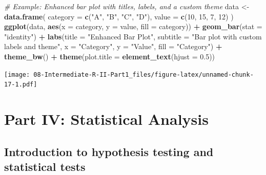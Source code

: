 \documentclass[
]{book}
\newenvironment{Shaded}{\begin{snugshade}}{\end{snugshade}}
\newcommand{\AttributeTok}[1]{\textcolor[rgb]{0.13,0.29,0.53}{#1}}
\newcommand{\CommentTok}[1]{\textcolor[rgb]{0.56,0.35,0.01}{\textit{#1}}}
\newcommand{\DecValTok}[1]{\textcolor[rgb]{0.00,0.00,0.81}{#1}}
\newcommand{\FloatTok}[1]{\textcolor[rgb]{0.00,0.00,0.81}{#1}}
\newcommand{\FunctionTok}[1]{\textcolor[rgb]{0.13,0.29,0.53}{\textbf{#1}}}
\newcommand{\NormalTok}[1]{#1}
\newcommand{\OtherTok}[1]{\textcolor[rgb]{0.56,0.35,0.01}{#1}}
\newcommand{\SpecialCharTok}[1]{\textcolor[rgb]{0.81,0.36,0.00}{\textbf{#1}}}
\newcommand{\StringTok}[1]{\textcolor[rgb]{0.31,0.60,0.02}{#1}}
\begin{document}
\begin{Shaded}
\begin{Highlighting}[]
\CommentTok{\# Example: Enhanced bar plot with titles, labels, and a custom theme}
\NormalTok{data }\OtherTok{\textless{}{-}} \FunctionTok{data.frame}\NormalTok{(}
  \AttributeTok{category =} \FunctionTok{c}\NormalTok{(}\StringTok{"A"}\NormalTok{, }\StringTok{"B"}\NormalTok{, }\StringTok{"C"}\NormalTok{, }\StringTok{"D"}\NormalTok{),}
  \AttributeTok{value =} \FunctionTok{c}\NormalTok{(}\DecValTok{10}\NormalTok{, }\DecValTok{15}\NormalTok{, }\DecValTok{7}\NormalTok{, }\DecValTok{12}\NormalTok{)}
\NormalTok{)}
\FunctionTok{ggplot}\NormalTok{(data, }\FunctionTok{aes}\NormalTok{(}\AttributeTok{x =}\NormalTok{ category, }\AttributeTok{y =}\NormalTok{ value, }\AttributeTok{fill =}\NormalTok{ category)) }\SpecialCharTok{+}
  \FunctionTok{geom\_bar}\NormalTok{(}\AttributeTok{stat =} \StringTok{"identity"}\NormalTok{) }\SpecialCharTok{+}
  \FunctionTok{labs}\NormalTok{(}\AttributeTok{title =} \StringTok{"Enhanced Bar Plot"}\NormalTok{,}
       \AttributeTok{subtitle =} \StringTok{"Bar plot with custom labels and theme"}\NormalTok{,}
       \AttributeTok{x =} \StringTok{"Category"}\NormalTok{,}
       \AttributeTok{y =} \StringTok{"Value"}\NormalTok{,}
       \AttributeTok{fill =} \StringTok{"Category"}\NormalTok{) }\SpecialCharTok{+}
  \FunctionTok{theme\_bw}\NormalTok{() }\SpecialCharTok{+}
  \FunctionTok{theme}\NormalTok{(}\AttributeTok{plot.title =} \FunctionTok{element\_text}\NormalTok{(}\AttributeTok{hjust =} \FloatTok{0.5}\NormalTok{))}
\end{Highlighting}
\end{Shaded}

\texttt{[image: 08-Intermediate-R-II-Part1\_files/figure-latex/unnamed-chunk-17-1.pdf]}

\chapter*{Part IV: Statistical Analysis}\label{part-iv-statistical-analysis}

\section*{Introduction to hypothesis testing and statistical tests}\label{introduction-to-hypothesis-testing-and-statistical-tests}
\end{document}
